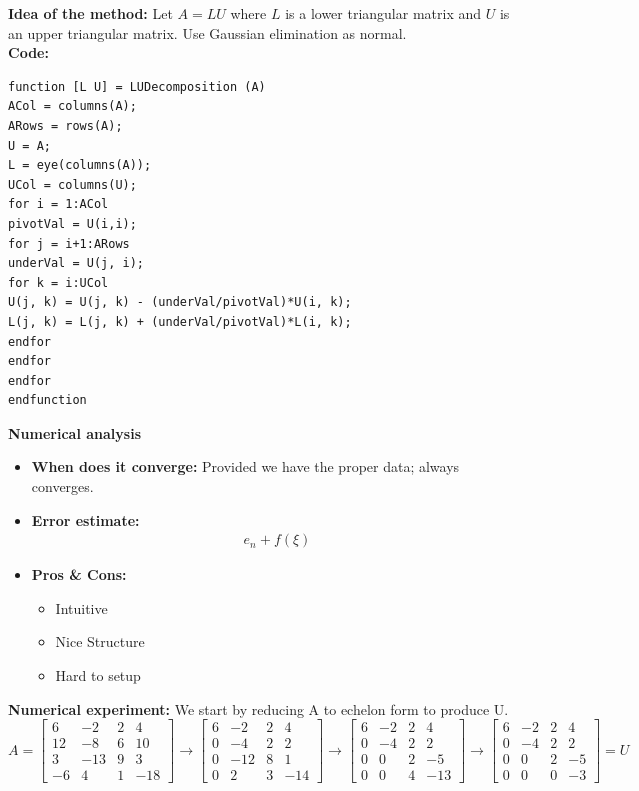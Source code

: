 \documentclass{article}
\begin{document}
{\bf Idea of the method:} 
Let $ A = LU $ where $ L $ is a lower triangular matrix and $ U $ is an upper triangular matrix. Use Gaussian elimination as normal.
{\\\bf Code:}
\begin{verbatim}
function [L U] = LUDecomposition (A)
ACol = columns(A);
ARows = rows(A);
U = A;
L = eye(columns(A));
UCol = columns(U);
for i = 1:ACol
pivotVal = U(i,i);
for j = i+1:ARows
underVal = U(j, i);
for k = i:UCol
U(j, k) = U(j, k) - (underVal/pivotVal)*U(i, k);
L(j, k) = L(j, k) + (underVal/pivotVal)*L(i, k);
endfor
endfor
endfor
endfunction
\end{verbatim}
{\bf Numerical analysis}
\begin{itemize}
	\item{\bf When does it converge:} Provided we have the proper data; always converges.
	\item {\bf Error estimate:}
	\begin{equation}
	\begin{split}
	& e_n+f(\xi)
	\end{split}
	\end{equation}
	\item {\bf Pros \& Cons:}
	\begin{itemize}
		\item Intuitive
		\item Nice Structure
		\item Hard to setup
	\end{itemize}
\end{itemize}
{\bf Numerical experiment:}
   We start by reducing A to echelon form to produce U.\\
\[A = \begin{bmatrix} 
6 & -2 & 2 & 4\\
12 & -8 & 6 & 10\\
3 & -13 & 9 & 3\\
-6 & 4 & 1 & -18
\end{bmatrix} \rightarrow \begin{bmatrix} 
6 & -2 & 2 & 4\\
0 & -4 & 2 & 2\\
0 & -12 & 8 & 1\\
0 & 2 & 3 & -14
\end{bmatrix} \rightarrow \begin{bmatrix} 
6 & -2 & 2 & 4\\
0 & -4 & 2 & 2\\
0 & 0 & 2 & -5\\
0 & 0 & 4 & -13
\end{bmatrix} \rightarrow \begin{bmatrix} 
6 & -2 & 2 & 4\\
0 & -4 & 2 & 2\\
0 & 0 & 2 & -5\\
0 & 0 & 0 & -3
\end{bmatrix} = U\]
\end{document}
